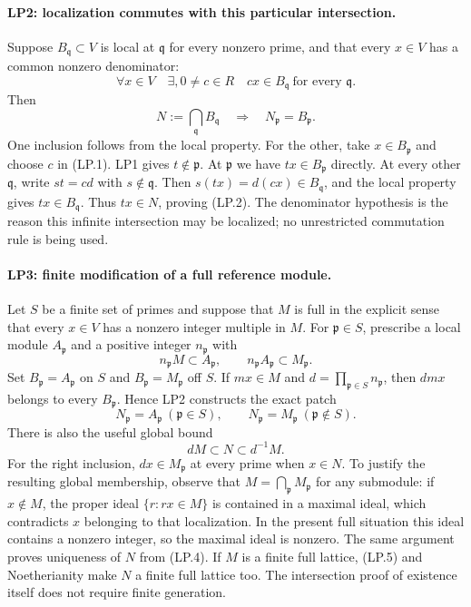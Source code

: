 \documentclass[11pt,a4paper]{article}
\numberwithin{equation}{section}
\theoremstyle{remark}\newtheorem{remark}[theorem]{Remark}
\begin{document}
\paragraph{LP2: localization commutes with this particular intersection.}
Suppose $B_{\mathfrak q}\subset V$ is local at $\mathfrak q$ for
every nonzero prime, and that every $x\in V$ has a common nonzero
denominator:
\[
 \forall x\in V\quad\exists,0\ne c\in R\quad
                   cx\in B_{\mathfrak q}\ \text{for every }\mathfrak q.
                                                               \tag{LP.1}
\]
Then
\[
 N:=\bigcap_{\mathfrak q}B_{\mathfrak q}
       \quad\Longrightarrow\quad N_{\mathfrak p}=B_{\mathfrak p}.
                                                               \tag{LP.2}
\]
One inclusion follows from the local property. For the other, take
$x\in B_{\mathfrak p}$ and choose $c$ in (LP.1). LP1 gives
$t\notin\mathfrak p$. At $\mathfrak p$ we have
$tx\in B_{\mathfrak p}$ directly. At every other
$\mathfrak q$, write $st=cd$ with $s\notin\mathfrak q$.
Then $s(tx)=d(cx)\in B_{\mathfrak q}$, and the local property
gives $tx\in B_{\mathfrak q}$. Thus $tx\in N$, proving (LP.2).
The denominator hypothesis is the reason this infinite intersection
may be localized; no unrestricted commutation rule is being used.

\paragraph{LP3: finite modification of a full reference module.}
Let $S$ be a finite set of primes and suppose that $M$ is full in the
explicit sense that every $x\in V$ has a nonzero integer multiple in
$M$. For $\mathfrak p\in S$, prescribe a local module
$A_{\mathfrak p}$ and a positive integer $n_{\mathfrak p}$ with
\[
 n_{\mathfrak p}M\subset A_{\mathfrak p},\qquad
 n_{\mathfrak p}A_{\mathfrak p}\subset M_{\mathfrak p}.
                                                               \tag{LP.3}
\]
Set $B_{\mathfrak p}=A_{\mathfrak p}$ on $S$ and
$B_{\mathfrak p}=M_{\mathfrak p}$ off $S$. If $mx\in M$ and
$d=\prod_{\mathfrak p\in S}n_{\mathfrak p}$, then $dmx$ belongs
to every $B_{\mathfrak p}$. Hence LP2 constructs the exact patch
\[
 \boxed{\quad
 N_{\mathfrak p}=A_{\mathfrak p}\ (\mathfrak p\in S),\qquad
 N_{\mathfrak p}=M_{\mathfrak p}\ (\mathfrak p\notin S).
 \quad}                                                       \tag{LP.4}
\]
There is also the useful global bound
\[
                        dM\subset N\subset d^{-1}M.            \tag{LP.5}
\]
For the right inclusion, $dx\in M_{\mathfrak p}$ at every prime
when $x\in N$. To justify the resulting global membership, observe
that $M=\bigcap_{\mathfrak p}M_{\mathfrak p}$ for any submodule:
if $x\notin M$, the proper ideal $\{r:rx\in M\}$ is contained
in a maximal ideal, which contradicts $x$ belonging to that
localization. In the present full situation this ideal contains a
nonzero integer, so the maximal ideal is nonzero. The same argument
proves uniqueness of $N$ from (LP.4).
If $M$ is a finite full lattice, (LP.5) and Noetherianity make $N$
a finite full lattice too. The intersection proof of existence
itself does not require finite generation.
\end{document}
